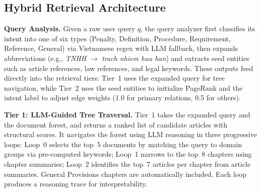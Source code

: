 \documentclass{IOS-Book-Article}
\begin{document}
\subsection{Hybrid Retrieval Architecture}
\label{sec:tiers}

\textbf{Query Analysis.}
Given a raw user query $q$, the query analyzer first classifies its intent into one of six types (Penalty, Definition, Procedure, Requirement, Reference, General) via Vietnamese regex with LLM fallback, then expands abbreviations (e.g., \textit{TNHH} $\to$ \textit{trach nhiem huu han}) and extracts seed entities such as article references, law references, and legal keywords. These outputs feed directly into the retrieval tiers: Tier~1 uses the expanded query for tree navigation, while Tier~2 uses the seed entities to initialize PageRank and the intent label to adjust edge weights (1.0 for primary relations, 0.5 for others).

\textbf{Tier 1: LLM-Guided Tree Traversal.}
Tier~1 takes the expanded query and the document forest, and returns a ranked list of candidate articles with structural scores. It navigates the forest using LLM reasoning in three progressive loops: Loop~0 selects the top~5 documents by matching the query to domain groups via pre-computed keywords; Loop~1 narrows to the top~8 chapters using chapter summaries; Loop~2 identifies the top~7 articles per chapter from article summaries. General Provisions chapters are automatically included. Each loop produces a reasoning trace for interpretability.
\end{document}
